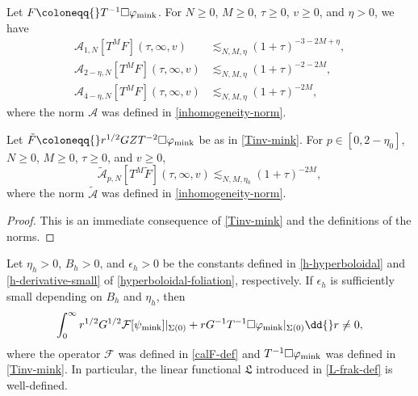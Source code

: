 \documentclass[10pt, reqno]{amsart}
\begin{document}
\begin{corollary}
Let \(F\coloneqq{}T^{-1}\Box{}\varphi_{\textnormal{mink}}\). For \(N\ge 0\), \(M\ge 0\), \(\tau{}\ge 0\), \(v\ge
0\), and \(\eta{} > 0\), we have
\begin{align}
\mathcal{A}_{1,N}[T^MF](\tau{},\infty,v)&\lesssim_{N,M,\eta{}} (1+\tau{})^{-3-2M+\eta{}}, \\
\mathcal{A}_{2-\eta{},N}[T^MF](\tau{},\infty,v)&\lesssim_{N,M,\eta{}} (1+\tau{})^{-2-2M}, \\
\mathcal{A}_{4-\eta{},N}[T^MF](\tau{},\infty,v)&\lesssim_{N,M,\eta{}} (1+\tau{})^{-2M},
\end{align}
where the norm \(\mathcal{A}\) was defined in \cref{inhomogeneity-norm}.

Let \(\tilde{F}\coloneqq{}r^{1/2}GZT^{-2}\Box{}\varphi_{\textnormal{mink}}\) be as in
\cref{Tinv-mink}. For \(p\in [0,2-\eta_0]\), \(N\ge 0\), \(M\ge 0\), \(\tau{}\ge
0\), and \(v\ge 0\),
\begin{equation}
\tilde{\mathcal{A}}_{p,N}[T^M\tilde{F}](\tau{},\infty,v)\lesssim_{N,M,\eta{}_0} (1+\tau{})^{-2M},
\end{equation}
where the norm \(\tilde{\mathcal{A}}\) was defined in \cref{inhomogeneity-norm}.
\label{A-norm-estimate}
\end{corollary}
\begin{proof}
This is an immediate consequence of \cref{Tinv-mink} and the definitions of the
norms.
\end{proof}
\begin{lemma}
Let \(\eta_h > 0\), \(B_h > 0\), and \(\epsilon_h > 0\) be the constants defined in
\cref{h-hyperboloidal} and \cref{h-derivative-small} of \cref{hyperboloidal-foliation},
respectively. If \(\epsilon_h\) is sufficiently small depending on \(B_h\) and \(\eta_h\),
then
\begin{equation}
\int_0^\infty r^{1/2}G^{1/2}\mathcal{F}[\psi{}_{\textnormal{mink}}]|_{\Sigma{}(0)} + rG^{-1}T^{-1}\Box{}\varphi{}_{\textnormal{mink}}|_{\Sigma{}(0)}\dd{}r\neq{}0,
\end{equation}
where the operator \(\mathcal{F}\) was defined in \cref{calF-def} and
\(T^{-1}\Box{}\varphi_{\textnormal{mink}}\) was defined in \cref{Tinv-mink}. In
particular, the linear functional \(\mathfrak{L}\) introduced in \cref{L-frak-def}
is well-defined.
\label{frakL-well-defined}
\end{lemma}
\end{document}
